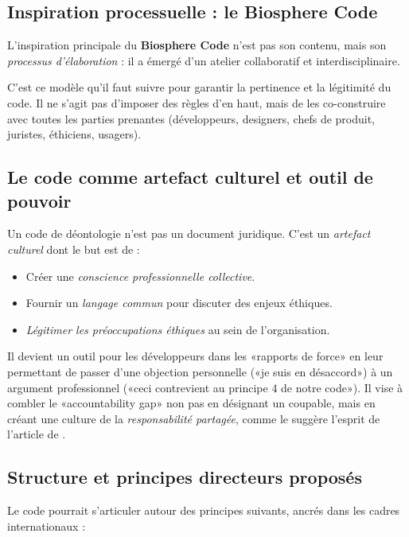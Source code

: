 \subsection{Inspiration processuelle : le Biosphere Code}
L'inspiration principale du \textbf{Biosphere Code} \citep{BiosphereCode2015} n'est pas son contenu, mais son \textit{processus d'élaboration} : il a émergé d'un atelier collaboratif et interdisciplinaire.

C'est ce modèle qu'il faut suivre pour garantir la pertinence et la légitimité du code. Il ne s'agit pas d'imposer des règles d'en haut, mais de les co-construire avec toutes les parties prenantes (développeurs, designers, chefs de produit, juristes, éthiciens, usagers).

\subsection{Le code comme artefact culturel et outil de pouvoir}
Un code de déontologie n'est pas un document juridique. C'est un \textit{artefact culturel} dont le but est de :
\begin{itemize}[label=\textbullet]
    \item Créer une \textit{conscience professionnelle collective}.
    \item Fournir un \textit{langage commun} pour discuter des enjeux éthiques.
    \item \textit{Légitimer les préoccupations éthiques} au sein de l'organisation.
\end{itemize}
Il devient un outil pour les développeurs dans les «rapports de force» en leur permettant de passer d'une objection personnelle («je suis en désaccord») à un argument professionnel («ceci contrevient au principe 4 de notre code»). Il vise à combler le «accountability gap» non pas en désignant un coupable, mais en créant une culture de la \textit{responsabilité partagée}, comme le suggère l'esprit de l'article de \citet{Neuer2018}.

\subsection{Structure et principes directeurs proposés}
Le code pourrait s'articuler autour des principes suivants, ancrés dans les cadres internationaux :

